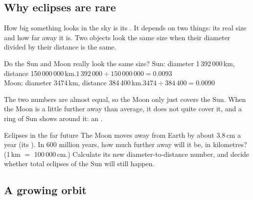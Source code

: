 \subsection{Why eclipses are rare}\label{sub:a1.2}


How big something looks in the sky is its . It depends on two things: its real size and how far away it is. Two objects look the same size when their diameter divided by their distance is the same.

\begin{idobox}{Do the Sun and Moon really look the same size?}
Sun: diameter 1\,392\,000\,km, distance 150\,000\,000\,km.\quad $1\,392\,000 \div 150\,000\,000 = 0.0093$\\
Moon: diameter 3474\,km, distance 384\,400\,km.\quad $3474 \div 384\,400 = 0.0090$

\smallskip
The two numbers are almost equal, so the Moon only just covers the Sun. When the Moon is a little further away than average, it does not quite cover it, and a ring of Sun shows around it: an .
\end{idobox}

\begin{wedobox}{Eclipses in the far future}
The Moon moves away from Earth by about 3.8\,cm a year (its ). In 600 million years, how much further away will it be, in kilometres? (1\,km $=$ 100\,000\,cm.) Calculate its new diameter-to-distance number, and decide whether total eclipses of the Sun will still happen.
\workbox{5.0cm}
\end{wedobox}

\subsection{A growing orbit}\label{sub:a1.3}


\begin{youdobox}[Challenge]
\workbox{5.0cm}
\end{youdobox}

\setcounter{section}{1}
\label{sec:2}\hypertarget{lesson.2.1}{}

